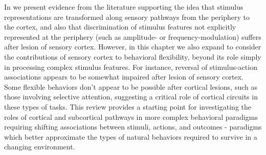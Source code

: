 %
In \ch{\Rev} we present evidence from the literature supporting the idea that stimulus representations are transformed along sensory pathways from the periphery to the cortex, and also that discrimination of stimulus features not explicitly represented at the periphery (such as amplitude- or frequency-modulation) suffers after lesion of sensory cortex.
%
However, in this chapter we also expand to consider the contributions of sensory cortex to behavioral flexibility, beyond its role simply in processing complex stimulus features. 
%
For instance, reversal of stimulus-action associations appears to be somewhat impaired after lesion of sensory cortex.
%
Some flexible behaviors don't appear to be possible after cortical lesions, such as those involving selective attention, suggesting a critical role of cortical circuits in these types of tasks. 
%
This review provides a starting point for investigating the roles of cortical and subcortical pathways in more complex behavioral paradigms requiring shifting associations between stimuli, actions, and outcomes - paradigms which better approximate the types of natural behaviors required to survive in a changing environment. 


